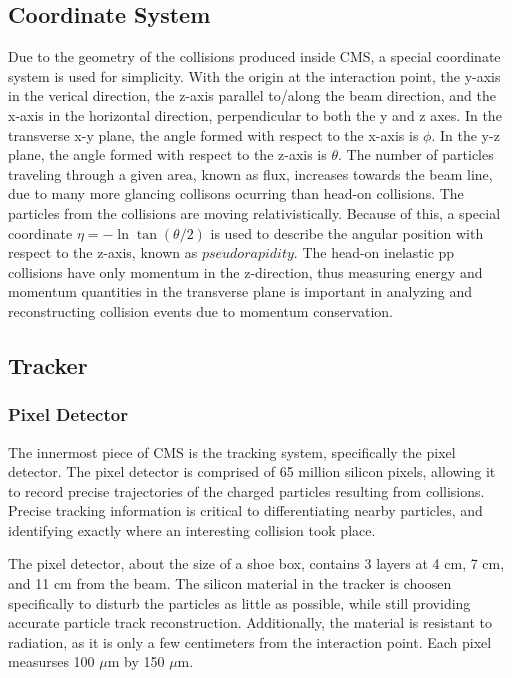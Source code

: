 \subsection{Coordinate System}
Due to the geometry of the collisions produced inside CMS, a special coordinate system is used for simplicity. With the origin at the interaction point,
the y-axis in the verical direction, the z-axis parallel to/along the beam direction, and the x-axis in the horizontal direction, perpendicular to both the y
and z axes. In the transverse x-y plane, the angle formed with respect to the x-axis is $\phi$. In the y-z plane, the angle formed with respect to the z-axis
is $\theta$. The number of particles traveling through a given area, known as flux, increases towards the beam line, due to many more glancing collisons ocurring
than head-on collisions. The particles from the collisions are moving relativistically. Because of this, a special coordinate $\eta = -\ln\tan(\theta/2)$ 
is used to describe the angular position with respect to the z-axis, known as $pseudorapidity$. The head-on inelastic pp collisions have only momentum in the 
z-direction, thus measuring energy and momentum quantities in the transverse plane is important in analyzing and reconstructing collision events due to momentum
conservation.  

\subsection{Tracker}
\subsubsection{Pixel Detector}
The innermost piece of CMS is the tracking system, specifically the pixel detector. The pixel detector is comprised of 65 million silicon pixels, allowing it to record
precise trajectories of the charged particles resulting from collisions. Precise tracking information is critical to differentiating nearby particles, and identifying
exactly where an interesting collision took place. 

The pixel detector, about the size of a shoe box, contains 3 layers at 4 cm, 7 cm, and 11 cm from the beam.
The silicon material in the tracker is choosen specifically to disturb the particles as little as possible, while still providing accurate particle track reconstruction.
Additionally, the material is resistant to radiation, as it is only a few centimeters from the interaction point. Each pixel measurses 100 $\mu$m by 150 $\mu$m. 

